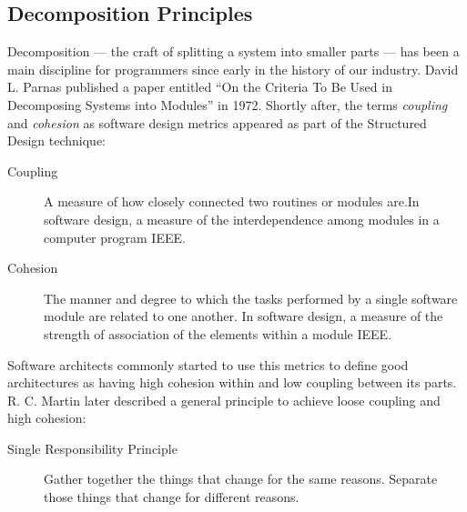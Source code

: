 

\subsection{Decomposition Principles}

Decomposition --- the craft of splitting a system into smaller parts --- has been a main discipline for programmers since early in the history of our industry. David L. Parnas published a paper entitled \enquote{On the Criteria To Be Used in Decomposing Systems into Modules} in 1972\cite{parnaDecomposing}. Shortly after, the terms \textit{coupling} 
and \textit{cohesion} as software design metrics appeared as part of the Structured Design technique\cite{structuredDesign}:

\begin{description}
	\item[Coupling] A measure of how closely connected two routines or modules are.\newline In	software design, a measure of the interdependence among modules in a computer program  IEEE\cite{softwareVocabulary}.
	\item[Cohesion] The manner and degree to which the tasks performed by a single software module are related to one another. \newline 
	In software design, a measure of the strength of association of the elements within a module IEEE\cite{softwareVocabulary}.
\end{description}

Software architects commonly started to use this metrics to define good architectures as having high cohesion within and low coupling between its parts. R. C. Martin later described a general principle to achieve loose coupling and high cohesion:

\begin{description}
	\item[Single Responsibility Principle] Gather together the things that change for the same reasons. Separate those things that change for different reasons.\cite{SRP}
\end{description}


